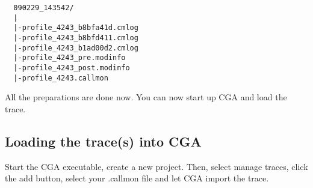 \begin{verbatim}
  090229_143542/
  |
  |-profile_4243_b8bfa41d.cmlog
  |-profile_4243_b8bfd411.cmlog
  |-profile_4243_b1ad00d2.cmlog
  |-profile_4243_pre.modinfo
  |-profile_4243_post.modinfo
  |-profile_4243.callmon
\end{verbatim}

All the preparations are done now. You can now start up CGA and load the trace.

\subsection{Loading the trace(s) into CGA} Start the CGA executable, create a new project. Then, select manage traces, click the add button, select your .callmon file and let CGA import the trace.
